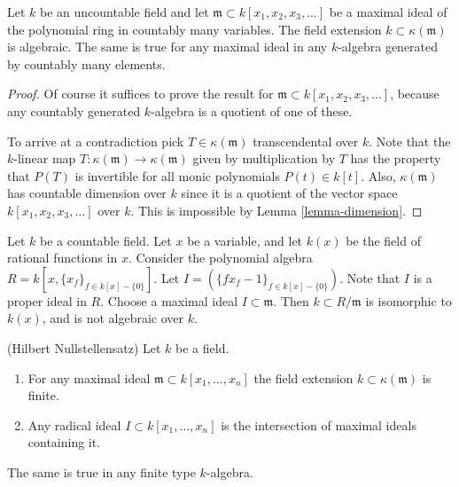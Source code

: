 \begin{theorem}
\label{theorem-uncountable-nullstellensatz}
Let $k$ be an uncountable field and let $\mathfrak m \subset
k[x_1, x_2, x_3, \ldots]$ be a maximal ideal of the polynomial
ring in countably many variables.
The field extension $k \subset \kappa(\mathfrak m)$
is algebraic. The same is true for any maximal ideal in
any $k$-algebra generated by countably many elements.
\end{theorem}

\begin{proof}
Of course it suffices to prove the result for $\mathfrak m \subset
k[x_1, x_2, x_3, \ldots]$, because any countably generated $k$-algebra
is a quotient of one of these.

\medskip\noindent
To arrive at a contradiction pick
$T \in \kappa(\mathfrak m)$ transcendental over $k$.
Note that the $k$-linear map $T : \kappa(\mathfrak m)
\to \kappa(\mathfrak m)$ given by multiplication by $T$
has the property that $P(T)$ is invertible for all
monic polynomials $P(t) \in k[t]$.
Also, $\kappa(\mathfrak m)$ has countable dimension
over $k$ since it is a quotient of the vector space
$k[x_1, x_2, x_3, \ldots]$ over $k$.
This is impossible by Lemma \ref{lemma-dimension}.
\end{proof}

\begin{example}
\label{example-countable-trick-does-not-work}
Let $k$ be a countable field. Let $x$ be a variable,
and let $k(x)$ be the field of rational functions in $x$.
Consider the polynomial algebra $R = k[x, \{x_f\}_{f \in k[x]-\{0\}}]$.
Let $I = (\{fx_f - 1\}_{f\in k[x] - \{0\}})$. Note that
$I$ is a proper ideal in $R$.
Choose a maximal ideal $I \subset \mathfrak m$.
Then $k \subset R/\mathfrak m$ is isomorphic to
$k(x)$, and is not algebraic over $k$.
\end{example}

\begin{theorem}
\label{theorem-nullstellensatz}
(Hilbert Nullstellensatz)
Let $k$ be a field.
\begin{enumerate}
\item For any maximal ideal $\mathfrak m \subset k[x_1, \ldots, x_n]$
the field extension $k \subset \kappa(\mathfrak m)$ is finite.
\label{item-finite-kappa}
\item Any radical ideal $I \subset k[x_1, \ldots, x_n]$
is the intersection of maximal ideals containing it.
\label{item-polynomial-ring-Jacobson}
\end{enumerate}
The same is true in any finite type $k$-algebra.
\end{theorem}

